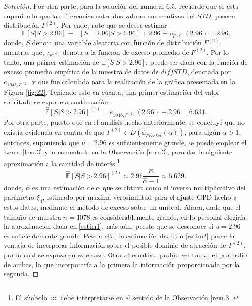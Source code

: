 \documentclass[10.5pt,notitlepage]{article}
\newenvironment{solucion}
  {\begin{proof}[Solución]}
  {\end{proof}}
\newcommand{\EE}{\mathbb{E}}
\theoremstyle{plain}
\begin{document}
\begin{solucion}
Por otra parte, para la solución del numeral 6.5, recuerde que se esta suponiendo que las diferencias entre dos valores consecutivas del \(STD\), poseen distribución \(F^{(2)}\). Por ende, note que se desea estimar
\[
\EE[S| S > 2.96] = \EE[S- 2.96| S > 2.96] + 2.96 = e_{F^{(2)}}(2.96) + 2.96. 
\]
donde, \(S\) denota una variable aleatoria con función de distribución \(F^{(2)}\), mientras que, \(e_{F^{(2)}}\) denota a la función de exceso promedio de \(F^{(2)}\). Por lo tanto, una primer estimación de \(\EE[S| S> 2.96]\), puede ser dada con la función de exceso promedio empírica de la muestra de datos de \(diffSTD\), denotada por \(e_{1048,F^{(2)}}\) y que fue calculada para la realización de la gráfica presentada en la Figura \ref{fig:22}. Teniendo esto en cuenta, una primer estimación del valor solicitado se expone a continuación: 
\begin{equation}\label{estim11}
\hat{\EE}[S| S> 2.96]^{(1)} =e_{1048,F^{(2)}}(2.96) + 2.96 =  6.631.     
\end{equation}
Por otra parte, puesto que en el análisis hecho anteriormente, se concluyó que no existía evidencia en contra de que \(F^{(2)} \in D(\phi_{Frechét}(\alpha))\), para algún \(\alpha > 1\), entonces, suponiendo que \(u = 2.96\) es suficientemente grande, se puede emplear el Lema \ref{lem.3} y lo comentado en la Observación \ref{rem.3}, para dar la siguiente aproximación a la cantidad de interés:\footnote{El símbolo \(\approx\) debe interpretarse en el sentido de la Observación \ref{rem.3}.}
\begin{equation}\label{estim2}
\hat{\EE}[S| S > 2.96]^{(2)}  \approx 2.96\frac{\hat{\alpha}}{ \hat{\alpha} - 1} \approx 5.629.    
\end{equation}
donde, \(\hat{\alpha}\) es una estimación de \(\alpha\) que se obtuvo como el inverso multiplicativo del parámetro \(\xi_4\), estimado por máxima verosimilitud para el ajuste GPD hecho a estos datos, mediante el método de exceso sobre un umbral. Ahora, dado que el tamaño de muestra \(n = 1078\) es considerablemente grande, en lo personal elegiría la aproximación dada en \eqref{estim1}, más aún, puesto que se desconoce si \(u = 2.96\) es suficientemente grande. Pese a ello, la estimación dada en \eqref{estim2} posee la ventaja de incorporar información sobre el posible dominio de atracción de \(F^{(2)}\), por lo cual se expuso en este caso. Otra alternativa, podría ser tomar el promedio de ambas, lo que incorporaría a la primera la información proporcionada por la segunda. 

\end{solucion}
\newpage
\end{document}
